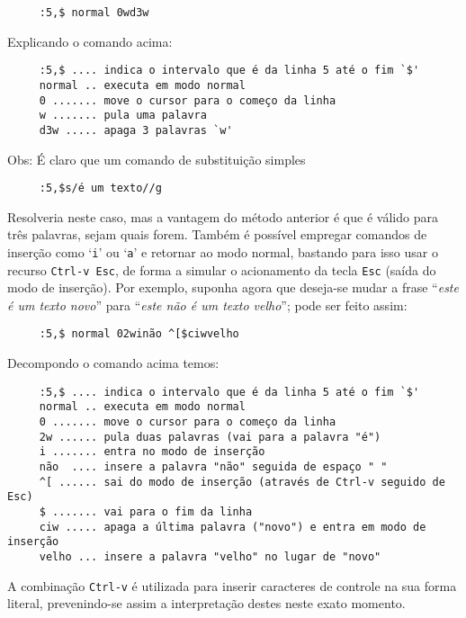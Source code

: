 \begin{verbatim}
     :5,$ normal 0wd3w
\end{verbatim}

Explicando o comando acima:

\begin{verbatim}
     :5,$ .... indica o intervalo que é da linha 5 até o fim `$'
     normal .. executa em modo normal
     0 ....... move o cursor para o começo da linha
     w ....... pula uma palavra
     d3w ..... apaga 3 palavras `w'
\end{verbatim}

Obs: É claro que um comando de substituição simples

\begin{verbatim}
     :5,$s/é um texto//g
\end{verbatim}

Resolveria neste caso, mas a vantagem do método anterior é que
é válido para três palavras, sejam quais forem.  
Também é possível empregar comandos de inserção como `{\tt i}' ou `{\tt a}' e
retornar ao modo normal, bastando para isso usar o recurso \verb|Ctrl-v Esc|,
de forma a simular o acionamento da tecla \verb|Esc| (saída do modo de
inserção). Por exemplo, suponha agora que deseja-se mudar a frase ``{\em este
é um texto novo}'' para ``{\em este não é um texto velho}''; pode ser feito
assim:

\begin{verbatim}
     :5,$ normal 02winão ^[$ciwvelho
\end{verbatim}

Decompondo o comando acima temos:

\begin{verbatim}
     :5,$ .... indica o intervalo que é da linha 5 até o fim `$'
     normal .. executa em modo normal
     0 ....... move o cursor para o começo da linha
     2w ...... pula duas palavras (vai para a palavra "é")
     i ....... entra no modo de inserção
     não  .... insere a palavra "não" seguida de espaço " "
     ^[ ...... sai do modo de inserção (através de Ctrl-v seguido de Esc)
     $ ....... vai para o fim da linha
     ciw ..... apaga a última palavra ("novo") e entra em modo de inserção
     velho ... insere a palavra "velho" no lugar de "novo"
\end{verbatim}

A combinação \verb|Ctrl-v| é utilizada para inserir caracteres de controle na
sua forma literal, prevenindo-se assim a interpretação destes neste exato
momento.

